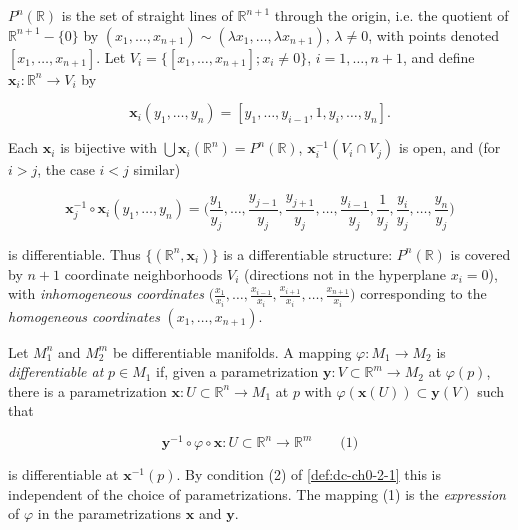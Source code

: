 \begin{example}
  \label{ex:dc-ch0-2-4}
  \notready
  $P^n(\mathbb{R})$ is the set of straight lines of $\mathbb{R}^{n+1}$ through the
  origin, i.e. the quotient of $\mathbb{R}^{n+1}-\{0\}$ by
  $(x_1,\dots,x_{n+1})\sim(\lambda x_1,\dots,\lambda x_{n+1})$, $\lambda\neq0$,
  with points denoted $[x_1,\dots,x_{n+1}]$. Let
  $V_i=\{[x_1,\dots,x_{n+1}]; x_i\neq0\}$, $i=1,\dots,n+1$, and define
  $\mathbf{x}_i:\mathbb{R}^n\to V_i$ by
  
  $$
  \mathbf{x}_i(y_1,\dots,y_n)=[y_1,\dots,y_{i-1},1,y_i,\dots,y_n].
  $$
  
  Each $\mathbf{x}_i$ is bijective with $\bigcup\mathbf{x}_i(\mathbb{R}^n)=P^n(\mathbb{R})$,
  $\mathbf{x}_i^{-1}(V_i\cap V_j)$ is open, and (for $i>j$, the case $i<j$ similar)
  
  $$
  \mathbf{x}_j^{-1}\circ\mathbf{x}_i(y_1,\dots,y_n)=\Big(\frac{y_1}{y_j},\dots,\frac{y_{j-1}}{y_j},\frac{y_{j+1}}{y_j},\dots,\frac{y_{i-1}}{y_j},\frac{1}{y_j},\frac{y_i}{y_j},\dots,\frac{y_n}{y_j}\Big)
  $$
  
  is differentiable. Thus $\{(\mathbb{R}^n,\mathbf{x}_i)\}$ is a differentiable
  structure: $P^n(\mathbb{R})$ is covered by $n+1$ coordinate neighborhoods $V_i$
  (directions not in the hyperplane $x_i=0$), with \emph{inhomogeneous coordinates}
  $\big(\frac{x_1}{x_i},\dots,\frac{x_{i-1}}{x_i},\frac{x_{i+1}}{x_i},\dots,\frac{x_{n+1}}{x_i}\big)$
  corresponding to the \emph{homogeneous coordinates} $(x_1,\dots,x_{n+1})$.
\end{example}

\begin{definition}
  \label{def:dc-ch0-2-5}
  \leanok
  Let $M_1^n$ and $M_2^m$ be differentiable manifolds. A mapping
  $\varphi:M_1\to M_2$ is \emph{differentiable at} $p\in M_1$ if, given a parametrization
  $\mathbf{y}:V\subset\mathbb{R}^m\to M_2$ at $\varphi(p)$, there is a
  parametrization $\mathbf{x}:U\subset\mathbb{R}^n\to M_1$ at $p$ with
  $\varphi(\mathbf{x}(U))\subset\mathbf{y}(V)$ such that
  
  $$
  \mathbf{y}^{-1}\circ\varphi\circ\mathbf{x}:U\subset\mathbb{R}^n\to\mathbb{R}^m\qquad\text{(1)}
  $$
  
  is differentiable at $\mathbf{x}^{-1}(p)$. By condition (2) of \cref{def:dc-ch0-2-1}
  this is independent of the choice of parametrizations. The mapping (1) is the
  \emph{expression} of $\varphi$ in the parametrizations $\mathbf{x}$ and $\mathbf{y}$.
\end{definition}

